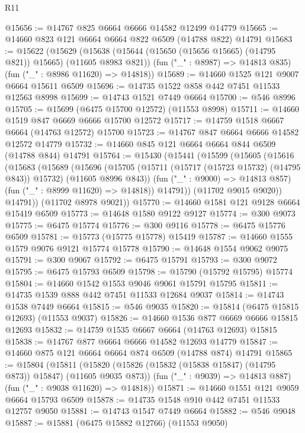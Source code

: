 \begin{lexlean}{R11}
\begin{coremodule}
{{{{{{{{{{{{{{{{{{{{{{{{{{{{{{{{{{{{{{{{{{{{{{{{{{{{{{{{{{{{{{{{{{{{{{{{{{{{{{{{{{@15656 := @14767 @825 @6664 @6666 @14582 @12499 @14779
@15665 := @14660 @823 @121 @6664 @6664 @822 @6509 (@14788 @822) @14791
@15683 := @15622
    (@15629
      (@15638 (@15644 (@15650 (@15656 @15665) (@14795 @821)) @15665) (@11605 @8983 @821))
      (fun ("_" : @8987) => @14813 @835)
      (fun ("_" : @8986 @11620) => @14818))
@15689 := @14660 @1525 @121 @9007 @6664 @15611 @6509
@15696 := @14735 @1522 @858 @442 @7451 @11533 @12563 @8998
@15699 := @14743 @1521 @7449 @6664
@15700 := @546 @8996
@15705 := @15699 (@6475 @15700 @12572) (@11553 @8998)
@15711 := @14660 @1519 @847 @6669 @6666 @15700 @12572
@15717 := @14759 @1518 @6667 @6664 (@14763 @12572) @15700
@15723 := @14767 @847 @6664 @6666 @14582 @12572 @14779
@15732 := @14660 @845 @121 @6664 @6664 @844 @6509 (@14788 @844) @14791
@15764 := @15430
    (@15441
      (@15599
        (@15605
          (@15616
            (@15683
              (@15689
                (@15696
                  (@15705
                    (@15711 (@15717 (@15723 @15732) (@14795 @843)) @15732)
                    (@11605 @8996 @843))
                  (fun ("_" : @9000) => @14813 @857)
                  (fun ("_" : @8999 @11620) => @14818))
                @14791))
            (@11702 @9015 @9020))
          @14791))
      (@11702 @8978 @9021))
@15770 := @14660 @1581 @121 @9128 @6664 @15419 @6509
@15773 := @14648 @1580 @9122 @9127
@15774 := @300 @9073
@15775 := @6475 @15774
@15776 := @300 @9116
@15778 := @6475 @15776 @6509
@15781 := @15773 (@15775 @15778) @15419
@15787 := @14660 @1555 @1579 @9076 @9121 @15774 @15778
@15790 := @14648 @1554 @9062 @9075
@15791 := @300 @9067
@15792 := @6475 @15791
@15793 := @300 @9072
@15795 := @6475 @15793 @6509
@15798 := @15790 (@15792 @15795) @15774
@15804 := @14660 @1542 @1553 @9046 @9061 @15791 @15795
@15811 := @14735 @1539 @888 @442 @7451 @11533 @12684 @9037
@15814 := @14743 @1538 @7449 @6664
@15815 := @546 @9035
@15820 := @15814 (@6475 @15815 @12693) (@11553 @9037)
@15826 := @14660 @1536 @877 @6669 @6666 @15815 @12693
@15832 := @14759 @1535 @6667 @6664 (@14763 @12693) @15815
@15838 := @14767 @877 @6664 @6666 @14582 @12693 @14779
@15847 := @14660 @875 @121 @6664 @6664 @874 @6509 (@14788 @874) @14791
@15865 := @15804
    (@15811
      (@15820 (@15826 (@15832 (@15838 @15847) (@14795 @873)) @15847) (@11605 @9035 @873))
      (fun ("_" : @9039) => @14813 @887)
      (fun ("_" : @9038 @11620) => @14818))
@15871 := @14660 @1551 @121 @9059 @6664 @15793 @6509
@15878 := @14735 @1548 @910 @442 @7451 @11533 @12757 @9050
@15881 := @14743 @1547 @7449 @6664
@15882 := @546 @9048
@15887 := @15881 (@6475 @15882 @12766) (@11553 @9050)
}}}}}}}}}}}}}}}}}}}}}}}}}}}}}}}}}}}}}}}}}}}}}}}}}}}}}}}}}}}}}}}}}}}}}}}}}}}}}}}}}}
\end{coremodule}
\end{lexlean}
